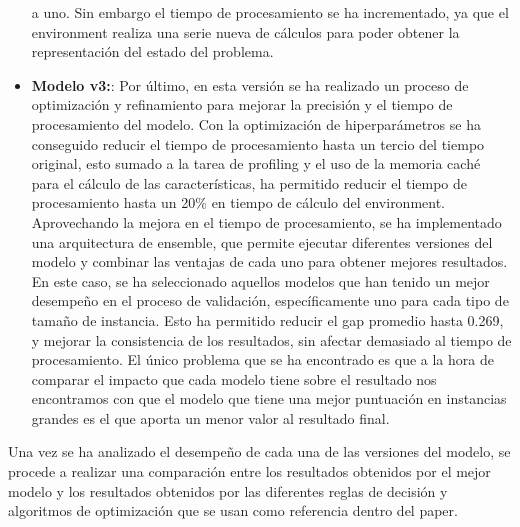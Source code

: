 \begin{itemize}
        a uno. Sin embargo el tiempo de procesamiento se ha incrementado, ya que el
        environment realiza una serie nueva de cálculos para poder obtener la
        representación del estado del problema.
    \item \textbf{Modelo v3:}: Por último, en esta versión se ha
        realizado un proceso de optimización y refinamiento para
        mejorar la precisión y el tiempo de procesamiento del modelo. 
        Con la optimización de hiperparámetros se ha conseguido reducir
        el tiempo de procesamiento hasta un tercio del tiempo original, esto
        sumado a la tarea de profiling y el uso de la memoria caché para el
        cálculo de las características, ha permitido reducir el tiempo de procesamiento
        hasta un 20\% en tiempo de cálculo del environment. Aprovechando la mejora
        en el tiempo de procesamiento, se ha implementado una arquitectura de
        ensemble, que permite ejecutar diferentes versiones del modelo y combinar
        las ventajas de cada uno para obtener mejores resultados. En este caso, se
        ha seleccionado aquellos modelos que han tenido un mejor desempeño en el
        proceso de validación, específicamente uno para cada tipo de tamaño de
        instancia. Esto ha permitido reducir el gap promedio hasta 0.269, y
        mejorar la consistencia de los resultados, sin afectar demasiado al
        tiempo de procesamiento. El único problema que se ha encontrado es que
        a la hora de comparar el impacto que cada modelo tiene sobre el resultado
        nos encontramos con que el modelo que tiene una mejor puntuación en 
        instancias grandes es el que aporta un menor valor al resultado final.
\end{itemize}

Una vez se ha analizado el desempeño de cada una de las versiones del modelo,
se procede a realizar una comparación entre los resultados obtenidos por el
mejor modelo y los resultados obtenidos por las diferentes reglas de decisión
y algoritmos de optimización que se usan como referencia dentro del 
paper\cite{pbrandimarte}.

